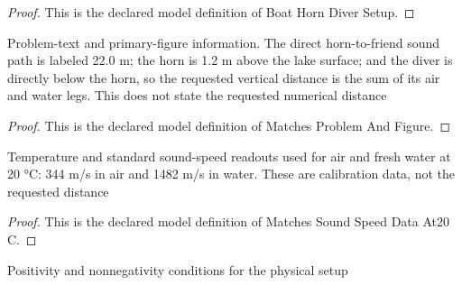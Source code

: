 \begin{proof}
  This is the declared model definition of Boat Horn Diver Setup.
\end{proof}
\begin{definition}
  \label{def:physics:phyx-mini-0168:phyxminiproblems-problemphyxmini0168-matchesproblemandfigure}
  Problem-text and primary-figure information. The direct horn-to-friend sound path is labeled 22.0 m; the horn is 1.2 m above the lake surface; and the diver is directly below the horn, so the requested vertical distance is the sum of its air and water legs. This does not state the requested numerical distance
\end{definition}
\begin{proof}
  This is the declared model definition of Matches Problem And Figure.
\end{proof}
\begin{definition}
  \label{def:physics:phyx-mini-0168:phyxminiproblems-problemphyxmini0168-matchessoundspeeddataat20c}
  Temperature and standard sound-speed readouts used for air and fresh water at 20 °C: 344 m/s in air and 1482 m/s in water. These are calibration data, not the requested distance
\end{definition}
\begin{proof}
  This is the declared model definition of Matches Sound Speed Data At20 C.
\end{proof}
\begin{definition}
  \label{def:physics:phyx-mini-0168:phyxminiproblems-problemphyxmini0168-hasphysicalparameters}
  Positivity and nonnegativity conditions for the physical setup
\end{definition}
